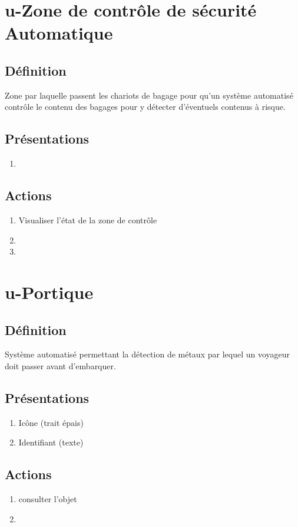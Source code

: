 \section{u-Zone de contrôle de sécurité Automatique}
\subsection{Définition}
	Zone par laquelle passent les chariots de bagage pour qu'un système automatisé contrôle le contenu des bagages pour y
	détecter d'éventuels contenus à risque.

\subsection{Présentations}
\begin{enumerate}
	\item \rectetiquette
\end{enumerate}

\subsection{Actions}
\begin{enumerate}
	\item Visualiser l'état de la zone de contrôle
	\item {}
	\item \transit
\end{enumerate}

\section{u-Portique}
\subsection{Définition}
	Système automatisé permettant la détection de métaux par lequel un voyageur doit passer avant d'embarquer.

\subsection{Présentations}
\begin{enumerate}
	\item Icône (trait épais)
	\item Identifiant (texte)
\end{enumerate}

\subsection{Actions}
\begin{enumerate}
	\item consulter l'objet
	\item \etat
\end{enumerate}

